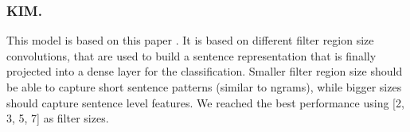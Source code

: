 \subsubsection{KIM.}
This model is based on this paper \cite{kim2014convolutional}. It is based on different filter region size convolutions, that are used to build a sentence representation that is finally projected into a dense layer for the classification.
Smaller filter region size should be able to capture short sentence patterns (similar to ngrams), while bigger sizes should capture sentence level features. We reached the best performance using [2, 3, 5, 7] as filter sizes.
